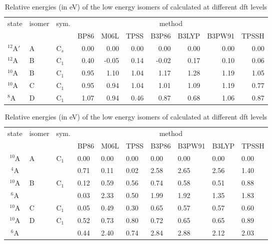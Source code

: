 \begin{refsection}
\begin{table}[h]
    \centering
    \small
	\caption{Relative energies (in eV) of the low energy isomers of  calculated at different \acrshort{dft} levels}
	\label{a7tbl:Cr3O3}
	\begin{tabular}{lllrrrrrrr}
		\hline
		\multirow{2}{*}{state} & \multirow{2}{*}{isomer} & \multirow{2}{*}{sym.} & \multicolumn{7}{c}{method}                           \\ \cline{4-10} 
							&      &       & BP86  & M06L & TPSS  & B3P86 & B3LYP   & B3PW91  & TPSSH \\ \hline
     $^{12}$A$'$    		& A    & C$_s$ & 0.00  & 0.00 & 0.00  & 0.00  & 0.00    & 0.00    & 0.00  \\
      $^{12}$A          	& B    & C$_1$ & 0.40  & -0.05& 0.14  & -0.02 & 0.17    & 0.10    & 0.06  \\
      $^{10}$A          	& B    & C$_1$ & 0.95  & 1.10 & 1.04  & 1.17  & 1.28    & 1.19    & 1.05  \\
      $^{10}$A          	& C    & C$_1$ & 0.95  & 0.94 & 1.04  & 1.01  & 1.09    & 1.19    & 0.77  \\
      $ ^8  $A          	& D    & C$_1$ & 1.07  & 0.94 & 0.46  & 0.87  & 0.68    & 1.06    & 0.87  \\ \hline
	\end{tabular}
\end{table}


\begin{table}[h]
    \centering
    \small
	\caption{Relative energies (in eV) of the low energy isomers of  calculated at different \acrshort{dft} levels}
	\label{a7tbl:Cr3O4}
	\begin{tabular}{clllllllll}
		\hline
		\multirow{2}{*}{state} & \multirow{2}{*}{isomer} & \multirow{2}{*}{sym.} & \multicolumn{7}{c}{method}                          \\ \cline{4-10} 
				  &      &         & BP86 & M06L & TPSS  & B3P86  & B3PW91  & B3LYP & TPSSH \\ \hline 
        $^{10}$A  & A    & C$_1$   & 0.00 & 0.00 & 0.00  & 0.00   & 0.00    & 0.00  & 0.00  \\
        $^4$A     &      &         & 0.71 & 0.11 & 0.02  & 2.58   & 2.65    & 2.56  & 1.40  \\
        $^{10}$A  & B    & C$_1$   & 0.12 & 0.59 & 0.56  & 0.74   & 0.58    & 0.51  & 0.88  \\
        $^6$A     &      &         & 0.03 & 2.33 & 0.50  & 1.99   & 1.92    & 1.35  & 1.83  \\
        $^{10}$A  & C    & C$_1$   & 0.05 & 0.49 & 0.30  & 0.65   & 0.57    & 0.57  & 0.60  \\
        $^{10}$A  & D    & C$_1$   & 0.52 & 0.73 & 0.80  & 0.72   & 0.65    & 0.65  & 0.89  \\
        $^6$A     &      &         & 0.44 & 2.40 & 0.74  & 2.84   & 2.88    & 2.12  & 2.03  \\ \hline
	\end{tabular}                               
\end{table}



\end{refsection}
